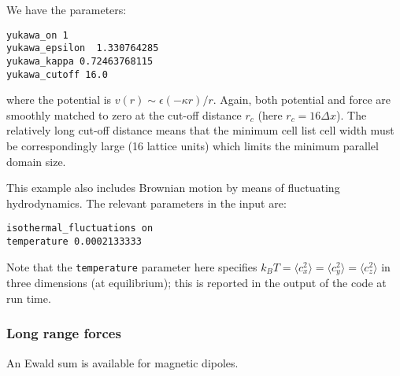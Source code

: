 We have the parameters:
\begin{verbatim}
yukawa_on 1
yukawa_epsilon  1.330764285
yukawa_kappa 0.72463768115
yukawa_cutoff 16.0
\end{verbatim}
where the potential is $v(r) \sim \epsilon (-\kappa r) / r$. Again,
both potential and force are smoothly matched to zero at the
cut-off distance $r_c$ (here $r_c = 16\Delta x$). The relatively
long cut-off distance means that the minimum cell list cell width
must be correspondingly large (16 lattice units) which limits the
minimum parallel domain size.

This example also includes Brownian motion by means of fluctuating
hydrodynamics. The relevant parameters in the input are:
\begin{verbatim}
isothermal_fluctuations on 
temperature 0.0002133333
\end{verbatim}
Note that the \texttt{temperature} parameter here specifies
$k_BT = \langle c_x^2\rangle = \langle c_y^2 \rangle = \langle c_z^2 \rangle$
in three dimensions (at equilibrium);
this is reported in the output of the code at run time.

\subsubsection{Long range forces}

An Ewald sum is available for magnetic dipoles.
